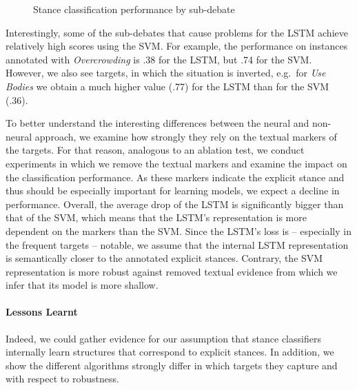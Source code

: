 \documentclass[11pt]{article}
\begin{document}
\begin{figure}[ht!]
	\vspace*{-4mm}
    \caption{Stance classification performance by sub-debate}
    \vspace*{-3mm}
\label{fig:performance_perSubtargets}
   \end{figure}

Interestingly, some of the sub-debates that cause problems for the LSTM achieve relatively high scores using the SVM. 
For example, the performance on instances annotated with \textit{Overcrowding} is .38 for the LSTM, but .74 for the SVM.
However, we also see targets, in which the situation is inverted, e.g.\ for \textit{Use Bodies} we obtain a much higher value (.77) for the LSTM than for the SVM (.36).

To better understand the interesting differences between the neural and non-neural approach, we examine how strongly they rely on the textual markers of the targets.
For that reason, analogous to an ablation test, we conduct experiments in which we remove the textual markers and examine the impact on the classification performance.
As these markers indicate the explicit stance and thus should be especially important for learning models, we expect a decline in performance.
Overall, the average drop of the LSTM is significantly bigger than that of the SVM, which means that the LSTM's representation is more dependent on the markers than the SVM.
Since the LSTM's loss is -- especially in the frequent targets -- notable, we assume that the internal LSTM representation is semantically closer to the annotated explicit stances.
Contrary, the SVM representation is more robust against removed textual evidence from which we infer that its model is more shallow.
   
\paragraph{Lessons Learnt}
Indeed, we could gather evidence for our assumption that stance classifiers internally learn structures that correspond to explicit stances.
In addition, we show the different algorithms strongly differ in which targets they capture and with respect to robustness.
\end{document}
